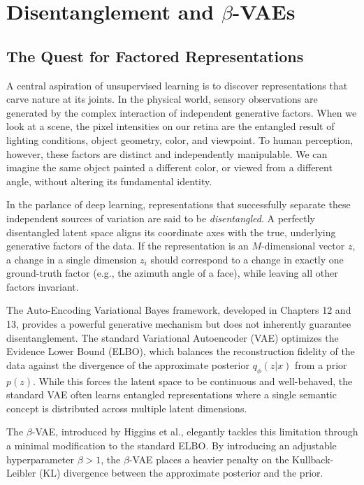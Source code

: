 \chapter{Disentanglement and $\beta$-VAEs}
\label{ch:beta_vae}

\section{The Quest for Factored Representations}

A central aspiration of unsupervised learning is to discover representations that carve nature at its joints. In the physical world, sensory observations are generated by the complex interaction of independent generative factors. When we look at a scene, the pixel intensities on our retina are the entangled result of lighting conditions, object geometry, color, and viewpoint. To human perception, however, these factors are distinct and independently manipulable. We can imagine the same object painted a different color, or viewed from a different angle, without altering its fundamental identity.

In the parlance of deep learning, representations that successfully separate these independent sources of variation are said to be \textit{disentangled}. A perfectly disentangled latent space aligns its coordinate axes with the true, underlying generative factors of the data. If the representation is an $M$-dimensional vector $z$, a change in a single dimension $z_i$ should correspond to a change in exactly one ground-truth factor (e.g., the azimuth angle of a face), while leaving all other factors invariant.

The Auto-Encoding Variational Bayes framework, developed in Chapters 12 and 13, provides a powerful generative mechanism but does not inherently guarantee disentanglement. The standard Variational Autoencoder (VAE) optimizes the Evidence Lower Bound (ELBO), which balances the reconstruction fidelity of the data against the divergence of the approximate posterior $q_\phi(z|x)$ from a prior $p(z)$. While this forces the latent space to be continuous and well-behaved, the standard VAE often learns entangled representations where a single semantic concept is distributed across multiple latent dimensions.

The $\beta$-VAE, introduced by Higgins et al., elegantly tackles this limitation through a minimal modification to the standard ELBO. By introducing an adjustable hyperparameter $\beta > 1$, the $\beta$-VAE places a heavier penalty on the Kullback-Leibler (KL) divergence between the approximate posterior and the prior. 

